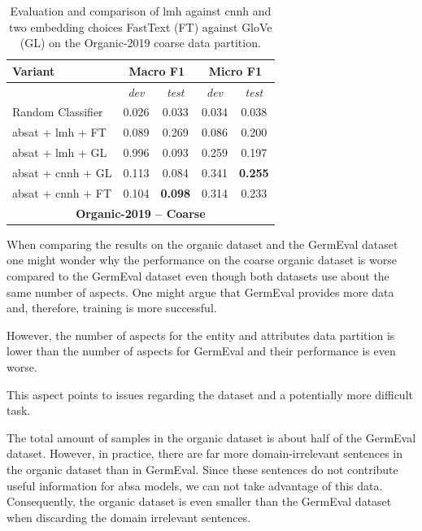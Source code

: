 \begin{table}[htb]
    \centering
    \begin{tabular*}{\textwidth}{l@{\extracolsep{\fill}}cccc@{}}
    \toprule
    Variant          & \multicolumn{2}{c}{\textbf{Macro F1}}     & \multicolumn{2}{c}{\textbf{Micro F1}}       \\ 
    \midrule
                     & \textit{dev}          & \textit{test}         & \textit{dev}              & \textit{test}         \\
    \midrule

    Random Classifier                  &  0.026         & 0.033&  0.034 &   0.038                  \\
    \gls{absat} + \gls{lmh} + FT    & 0.089     & 0.269    &  0.086 &   0.200               \\ 
    \gls{absat} + \gls{lmh} + GL    & 0.996     & 0.093    &  0.259 &   0.197               \\ 

    \gls{absat} + \gls{cnnh} + GL   & 0.113     & 0.084    & 0.341   &  \textbf{0.255}                 \\     
    \gls{absat} + \gls{cnnh} + FT   & 0.104     & \textbf{0.098} & 0.314  &   0.233                \\ 
    \bottomrule
    \multicolumn{5}{c}{\textbf{Organic-2019 -- Coarse}} \\
    \end{tabular*}
    \caption{Evaluation and comparison of \acrfull{lmh} against \acrfull{cnnh} and two embedding choices FastText {(FT)} against GloVe {(GL)} on the Organic-2019 coarse data partition.}
    \label{tab:06_resultsOrganic2}
\end{table}

When comparing the results on the organic dataset and the GermEval dataset one might wonder why the performance on the coarse organic dataset is worse compared to the GermEval dataset even though both datasets use about the same number of aspects. One might argue that GermEval provides more data and, therefore, training is more successful.

However, the number of aspects for the entity and attributes data partition is lower than the number of aspects for GermEval and their performance is even worse.

This aspect points to issues regarding the dataset and a potentially more difficult task. 
\medskip

The total amount of samples in the organic dataset is about half of the GermEval dataset. However, in practice, there are far more domain-irrelevant sentences in the organic dataset than in GermEval. Since these sentences do not contribute useful information for \gls{absa} models, we can not take advantage of this data. Consequently, the organic dataset is even smaller than the GermEval dataset when discarding the domain irrelevant sentences.
\medskip

